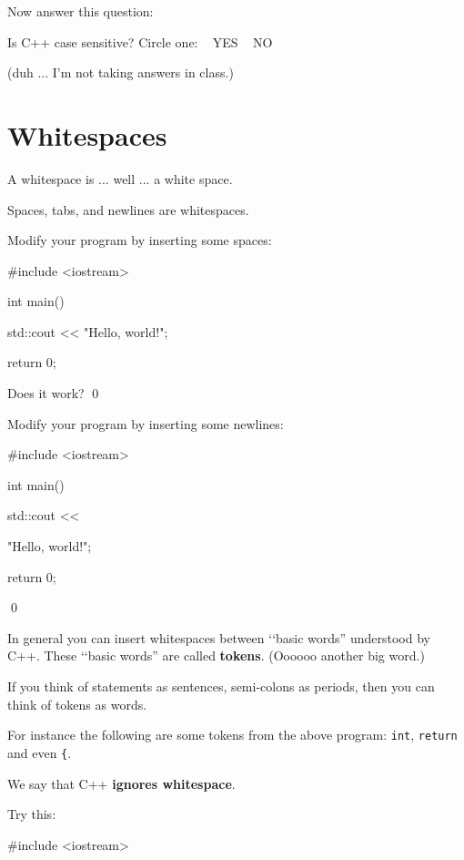 \begin{console}[commandchars=\~\!\@]
Now answer this question:

Is C++ case sensitive? Circle one: \,\,\, YES  \,\,\, NO

(duh ... I'm not taking answers in class.)






\newpage\section{Whitespaces}

A whitespace is ... well ... a white space.

Spaces, tabs, and newlines are whitespaces.


\begin{ex}
Modify your program by inserting some spaces:
\begin{console}
#include <iostream>

int main()
{
    std::cout            << "Hello, world!\n";

    return 0;
}
\end{console}
Does it work?
\qed
\end{ex}

\begin{ex}
Modify your program by inserting some newlines:
\begin{console}
#include <iostream>

int main()
{
    std::cout << 




            "Hello, world!\n";

    return 0;
}
\end{console}
\qed
\end{ex}



In general you can insert whitespaces between 
\lq\lq basic words'' understood by C++. 
These \lq\lq basic words'' are called \textbf{tokens}. 
(Oooooo another big word.)

If you think of statements as sentences, 
semi-colons as periods, then you can think of tokens as words.


For instance the following are some tokens from the above program: 
\texttt{int}, \texttt{return} and even \texttt{\{}.

We say that C++ \textbf{ignores whitespace}. 


\begin{ex}
Try this:
\begin{console}
#include <iostream>


\end{console}
\end{ex}
\end{console}
